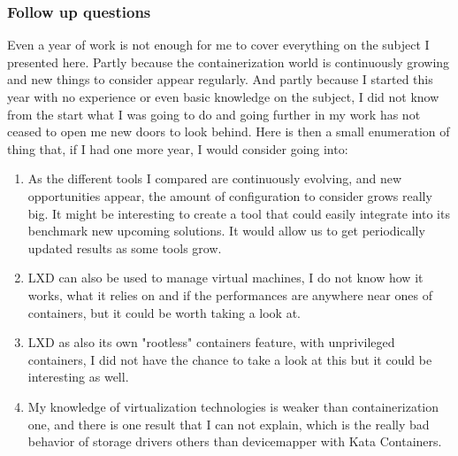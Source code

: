 \subsubsection{Follow up questions}

Even a year of work is not enough for me to cover everything on the subject I presented here.  Partly because the containerization world is continuously growing and new things to consider appear regularly.  And partly because I started this year with no experience or even basic knowledge on the subject, I did not know from the start what I was going to do and going further in my work has not ceased to open me new doors to look behind.  Here is then a small enumeration of thing that, if I had one more year, I would consider going into:
\begin{enumerate}
  \item As the different tools I compared are continuously evolving, and new opportunities appear, the amount of configuration to consider grows really big.  It might be interesting to create a tool that could easily integrate into its benchmark new upcoming solutions.  It would allow us to get periodically updated results as some tools grow.
  \item LXD can also be used to manage virtual machines, I do not know how it works, what it relies on and if the performances are anywhere near ones of containers, but it could be worth taking a look at.
  \item LXD as also its own "rootless" containers feature, with unprivileged containers, I did not have the chance to take a look at this but it could be interesting as well.
  \item My knowledge of virtualization technologies is weaker than containerization one, and there is one result that I can not explain, which is the really bad behavior of storage drivers others than devicemapper with Kata Containers.
\end{enumerate}
